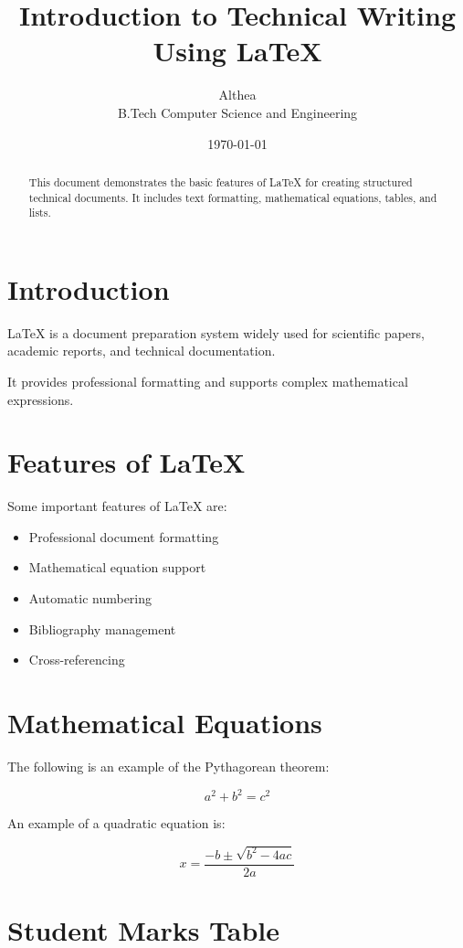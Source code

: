 \documentclass[12pt,a4paper]{article}
\title{\textbf{Introduction to Technical Writing Using LaTeX}}
\author{Althea \\ B.Tech Computer Science and Engineering}
\date{\today}
\begin{document}
\maketitle

\begin{abstract}
This document demonstrates the basic features of LaTeX
for creating structured technical documents. It includes
text formatting, mathematical equations, tables, and lists.
\end{abstract}

\section{Introduction}

LaTeX is a document preparation system widely used
for scientific papers, academic reports, and technical
documentation.

It provides professional formatting and supports
complex mathematical expressions.

\section{Features of LaTeX}

Some important features of LaTeX are:

\begin{itemize}
    \item Professional document formatting
    \item Mathematical equation support
    \item Automatic numbering
    \item Bibliography management
    \item Cross-referencing
\end{itemize}

\section{Mathematical Equations}

The following is an example of the Pythagorean theorem:

\[
a^2+b^2=c^2
\]

An example of a quadratic equation is:

\[
x = \frac{-b \pm \sqrt{b^2-4ac}}{2a}
\]

\section{Student Marks Table}
\end{document}
